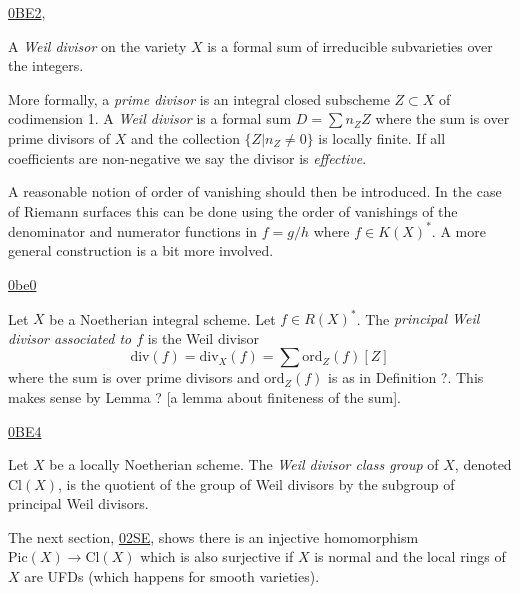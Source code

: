\documentclass{book}
\begin{document}
\begin{definition}
\label{definition-weil-divisor}
\begin{reference}
\href{https://stacks.math.columbia.edu/tag/%
0BE2}{0BE2},
\cite[p. 130]{hart}
\end{reference}
A {\it Weil divisor} on the variety $X$ is a
formal sum of irreducible
subvarieties over the integers.

More formally, a {\it prime divisor} is an
integral closed
subscheme $Z \subset X$ of codimension 1.
A {\it Weil divisor} is a formal sum $D=\sum
n_Z Z$ where
the sum is over prime divisors of $X$
and the collection
$\{Z|n_Z \neq  0\}$ is locally finite.
If all coefficients are non-negative we say
the divisor is {\it effective}.
\end{definition}

\noindent
A reasonable notion of order of vanishing
should then be introduced. In the case of
Riemann surfaces
this can be done using the order of
vanishings
of the denominator and numerator functions in
$f=g/h$ where $f \in K(X)^*$.
A more general construction is a bit more
involved.

\begin{definition}
\label{definition-principal-weil-divisor}
\begin{reference}
\href{https://stacks.math.columbia.edu/tag/%
0be0}{0be0}
\end{reference}
Let $X$ be a Noetherian integral scheme.
Let $f \in R(X)^*$.
The {\it principal Weil divisor associated to
$f$}
is the Weil divisor
$$
\text{div}(f)=\text{div}_X(f)
=\sum \text{ord}_Z(f)[Z]
$$
where the sum is over prime divisors and
$\text{ord}_Z(f)$ is as in Definition ?.
This makes sense by Lemma ? [a lemma about
finiteness of the sum].
\end{definition}

\begin{definition}
\label{definition-weil-divisor-class-group}
\begin{reference}
\href{https://stacks.math.columbia.edu/tag/%
0BE4}{0BE4}
\end{reference}
Let $X$ be a locally Noetherian scheme.
The {\it Weil divisor class group} of $X$,
denoted
$\text{Cl}(X)$, is the quotient
of the group of Weil divisors by the subgroup
of principal
Weil divisors.
\end{definition}

\noindent
The next section,
\href{https://stacks.math.columbia.edu/tag/%
02SE}{02SE},
shows there is an injective homomorphism
$\text{Pic}(X) \to \text{Cl}(X)$
which is also surjective if $X$ is normal
and the local rings of $X$ are UFDs
(which happens for smooth varieties).
\end{document}
